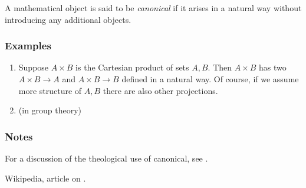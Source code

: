 \documentclass[12pt]{article}
\begin{document}
A mathematical object is said to be \emph{canonical}
if it arises in a natural way without introducing any additional objects. 

\subsubsection*{Examples}
\begin{enumerate}
\item Suppose $A\times B$ is the Cartesian product of sets $A,B$. 
Then $A\times B$ has two  
$A\times B\to A$
and $A\times B\to B$ defined in a natural way. Of course, if
we assume more structure of $A,B$ there are also other projections. 
\item {} (in group theory)
\end{enumerate}

\subsubsection*{Notes}
For a discussion of the theological use of canonical, see \cite{wiki}. 

\begin{thebibliography}{9}
 Wikipedia, article on .
\end{thebibliography}
\end{document}
